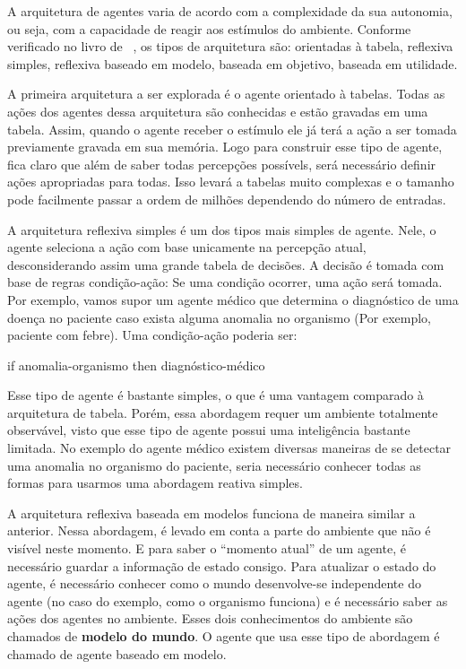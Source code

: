 A arquitetura de agentes varia de acordo com a complexidade da sua autonomia, ou seja, com a capacidade de reagir aos estímulos do ambiente. Conforme verificado no livro de ~\cite{novig95}, os tipos de arquitetura são: orientadas à tabela, reflexiva simples, reflexiva baseado em modelo, baseada em objetivo, baseada em utilidade.

A primeira arquitetura a ser explorada é o agente orientado à tabelas. Todas as ações dos agentes dessa arquitetura são conhecidas e estão gravadas em uma tabela. Assim, quando o agente receber o estímulo ele já terá a ação a ser tomada previamente gravada em sua memória. Logo para construir esse tipo de agente, fica claro que além de saber todas percepções possívels, será necessário definir ações apropriadas para todas. Isso levará a tabelas muito complexas e o tamanho pode facilmente passar a ordem de milhões dependendo do número de entradas.

A arquitetura reflexiva simples é um dos tipos mais simples de agente. Nele, o agente seleciona a ação com base unicamente na percepção atual, desconsiderando assim uma grande tabela de decisões. A decisão é tomada com base de regras condição-ação: Se uma condição ocorrer, uma ação será tomada. Por exemplo, vamos supor um agente médico que determina o diagnóstico de uma doença no paciente caso exista alguma anomalia no organismo (Por exemplo, paciente com febre). Uma condição-ação poderia ser:

if anomalia-organismo then diagnóstico-médico

Esse tipo de agente é bastante simples, o que é uma vantagem comparado à arquitetura de tabela. Porém, essa abordagem requer um ambiente totalmente observável, visto que esse tipo de agente possui uma inteligência bastante limitada. No exemplo do agente médico existem diversas maneiras de se detectar uma anomalia no organismo do paciente, seria necessário conhecer todas as formas para usarmos uma abordagem reativa simples.

A arquitetura reflexiva baseada em modelos funciona de maneira similar a anterior. Nessa abordagem, é levado em conta a parte do ambiente que não é visível neste momento. E para saber o ``momento atual'' de um agente, é necessário guardar a informação de estado consigo. Para atualizar o estado do agente, é necessário conhecer como o mundo desenvolve-se independente do agente (no caso do exemplo, como o organismo funciona) e é necessário saber as ações dos agentes no ambiente. Esses dois conhecimentos do ambiente são chamados de \textbf{modelo do mundo}. O agente que usa esse tipo de abordagem é chamado de agente baseado em modelo.

